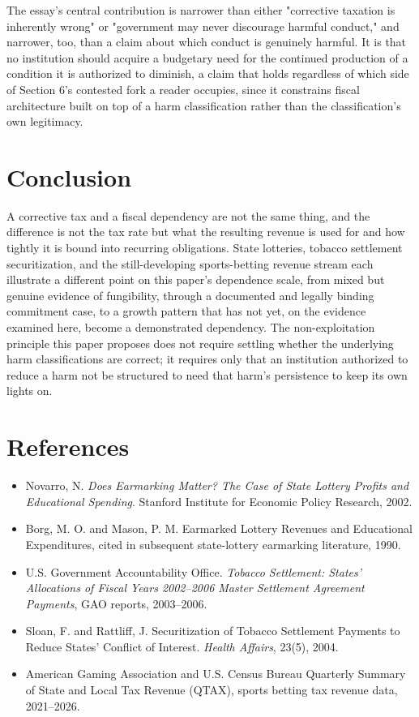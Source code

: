 \documentclass[11pt]{article}
\begin{document}
The essay's central contribution is narrower than either "corrective taxation is inherently wrong" or "government may never discourage harmful conduct," and narrower, too, than a claim about which conduct is genuinely harmful. It is that no institution should acquire a budgetary need for the continued production of a condition it is authorized to diminish, a claim that holds regardless of which side of Section 6's contested fork a reader occupies, since it constrains fiscal architecture built on top of a harm classification rather than the classification's own legitimacy.

\section{Conclusion}

A corrective tax and a fiscal dependency are not the same thing, and the difference is not the tax rate but what the resulting revenue is used for and how tightly it is bound into recurring obligations. State lotteries, tobacco settlement securitization, and the still-developing sports-betting revenue stream each illustrate a different point on this paper's dependence scale, from mixed but genuine evidence of fungibility, through a documented and legally binding commitment case, to a growth pattern that has not yet, on the evidence examined here, become a demonstrated dependency. The non-exploitation principle this paper proposes does not require settling whether the underlying harm classifications are correct; it requires only that an institution authorized to reduce a harm not be structured to need that harm's persistence to keep its own lights on.

\section*{References}
\begin{itemize}[nosep]
\item Novarro, N. \emph{Does Earmarking Matter? The Case of State Lottery Profits and Educational Spending}. Stanford Institute for Economic Policy Research, 2002.
\item Borg, M. O. and Mason, P. M. Earmarked Lottery Revenues and Educational Expenditures, cited in subsequent state-lottery earmarking literature, 1990.
\item U.S. Government Accountability Office. \emph{Tobacco Settlement: States' Allocations of Fiscal Years 2002--2006 Master Settlement Agreement Payments}, GAO reports, 2003--2006.
\item Sloan, F. and Rattliff, J. Securitization of Tobacco Settlement Payments to Reduce States' Conflict of Interest. \emph{Health Affairs}, 23(5), 2004.
\item American Gaming Association and U.S. Census Bureau Quarterly Summary of State and Local Tax Revenue (QTAX), sports betting tax revenue data, 2021--2026.
\end{itemize}
\end{document}
